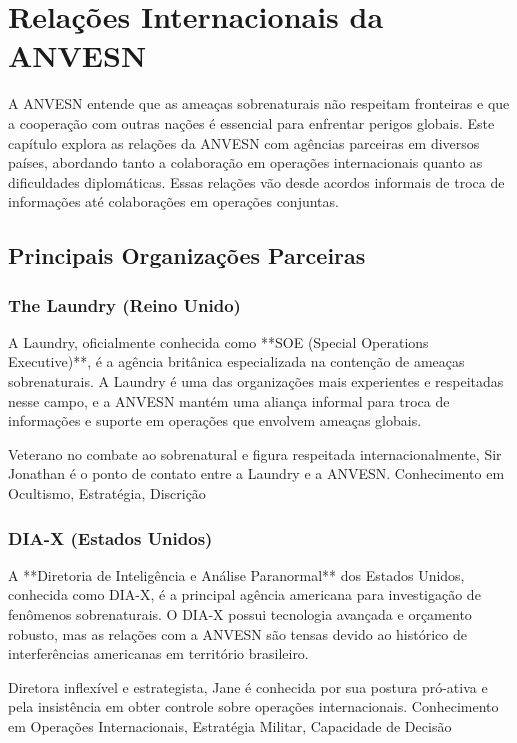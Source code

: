 \chapter{Relações Internacionais da ANVESN}

A ANVESN entende que as ameaças sobrenaturais não respeitam fronteiras e que a cooperação com outras nações é essencial para enfrentar perigos globais. Este capítulo explora as relações da ANVESN com agências parceiras em diversos países, abordando tanto a colaboração em operações internacionais quanto as dificuldades diplomáticas. Essas relações vão desde acordos informais de troca de informações até colaborações em operações conjuntas.

\section{Principais Organizações Parceiras}

\subsection{The Laundry (Reino Unido)}
A Laundry, oficialmente conhecida como **SOE (Special Operations Executive)**, é a agência britânica especializada na contenção de ameaças sobrenaturais. A Laundry é uma das organizações mais experientes e respeitadas nesse campo, e a ANVESN mantém uma aliança informal para troca de informações e suporte em operações que envolvem ameaças globais.

{Veterano no combate ao sobrenatural e figura respeitada internacionalmente, Sir Jonathan é o ponto de contato entre a Laundry e a ANVESN.}
{Conhecimento em Ocultismo, Estratégia, Discrição}

\subsection{DIA-X (Estados Unidos)}
A **Diretoria de Inteligência e Análise Paranormal** dos Estados Unidos, conhecida como DIA-X, é a principal agência americana para investigação de fenômenos sobrenaturais. O DIA-X possui tecnologia avançada e orçamento robusto, mas as relações com a ANVESN são tensas devido ao histórico de interferências americanas em território brasileiro.

{Diretora inflexível e estrategista, Jane é conhecida por sua postura pró-ativa e pela insistência em obter controle sobre operações internacionais.}
{Conhecimento em Operações Internacionais, Estratégia Militar, Capacidade de Decisão}

